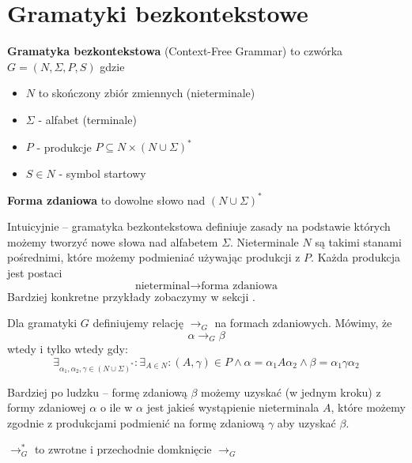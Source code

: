 \section{Gramatyki bezkontekstowe}

\begin{definition}
\textbf{Gramatyka bezkontekstowa} (Context-Free Grammar) to czwórka \( G = (N, \Sigma, P, S) \) gdzie
\begin{itemize}
    \item \( N \) to skończony zbiór zmiennych (nieterminale)
    \item \( \Sigma \) - alfabet (terminale)
    \item \( P \) - produkcje \( P \subseteq N \times (N \cup \Sigma)^* \)
    \item \( S \in N \) - symbol startowy
\end{itemize}
\end{definition}

\begin{definition}
    \textbf{Forma zdaniowa} to dowolne słowo nad \( (N \cup \Sigma)^* \)
\end{definition}

Intuicyjnie -- gramatyka bezkontekstowa definiuje zasady na podstawie których możemy tworzyć nowe słowa nad alfabetem \( \Sigma \).
Nieterminale \( N \) są takimi stanami pośrednimi, które możemy podmieniać używając produkcji z \( P \).
Każda produkcja jest postaci
\[
    \text{nieterminal} \rightarrow \text{forma zdaniowa}
\]
Bardziej konkretne przykłady zobaczymy w sekcji .


\begin{definition}
    Dla gramatyki \( G \) definiujemy relację \( \rightarrow_G \) na formach zdaniowych.
    Mówimy, że 
    \[ 
        \alpha \rightarrow_G \beta 
    \]
    wtedy i tylko wtedy gdy:
    \[
        \exists_{\alpha_1, \alpha_2, \gamma \in (N \cup \Sigma)^*} : \exists_{A \in N} : (A, \gamma) \in P \land
        \alpha = \alpha_1  A \alpha_2 \land \beta = \alpha_1 \gamma \alpha_2
    \]
\end{definition}

Bardziej po ludzku -- formę zdaniową \( \beta \) możemy uzyskać (w jednym kroku) z formy zdaniowej \( \alpha \) o ile w  \( \alpha \) jest jakieś wystąpienie nieterminala \( A \), które możemy zgodnie z produkcjami podmienić na formę zdaniową \( \gamma \) aby uzyskać \( \beta \).

\begin{definition}
    \( \rightarrow_G^* \) to zwrotne i przechodnie domknięcie \( \rightarrow_G \)
\end{definition}

